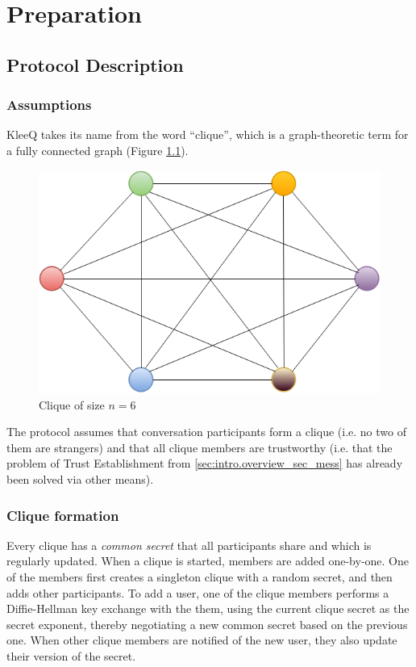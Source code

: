 \documentclass[a4paper, 12pt]{report}
\begin{document}
\chapter{Preparation}
\label{ch:prep}

\section{Protocol Description}
\label{sec:prep.proto}

\subsection{Assumptions}
KleeQ takes its name from the word ``clique'', which is a graph-theoretic term for a fully connected graph (Figure \ref{fig:clique}).
\begin{figure}[h]
    \centering
    \includegraphics[scale = 0.5]{pics/clique.png}
    \caption{Clique of size $n = 6$ \label{fig:clique}}
\end{figure}
The protocol assumes that conversation participants form a clique (i.e. no two of them are strangers) and that all clique members are trustworthy (i.e. that the problem of Trust Establishment from \cref{sec:intro.overview_sec_mess} has already been solved via other means). 


\subsection{Clique formation}
\label{subsec:prep.formation}
Every clique has a \emph{common secret} that all participants share and which is regularly updated. When a clique is started, members are added one-by-one. One of the members first creates a singleton clique with a random secret, and then adds other participants. To add a user, one of the clique members performs a Diffie-Hellman key exchange \cite{diffie1976new} with the them, using the current clique secret as the secret exponent, thereby negotiating a new common secret based on the previous one. When other clique members are notified of the new user, they also update their version of the secret. 
\end{document}
